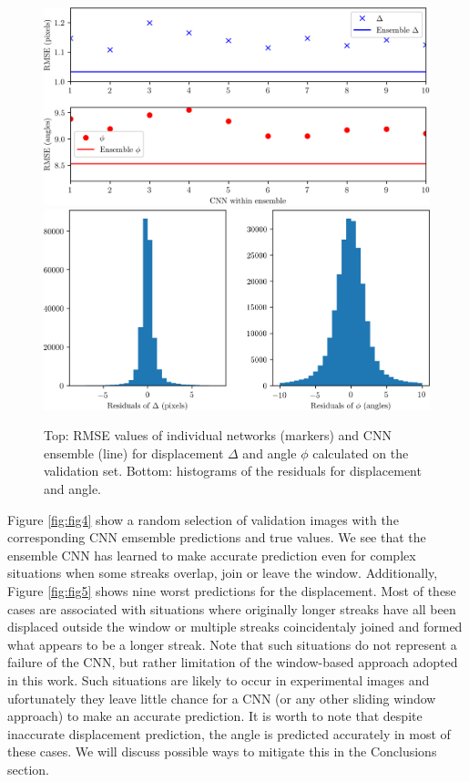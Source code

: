 \documentclass{svjour3}                     %
\begin{document}
\begin{figure}
\includegraphics[width=\textwidth]{figs/figure2a.png}
\includegraphics[width=\textwidth]{figs/figure2b.png}
\caption{Top: RMSE values of individual networks (markers) and CNN ensemble (line) for displacement $\Delta$ and angle $\phi$ calculated on the validation set. Bottom: histograms of the residuals for displacement and angle.}
\label{fig:fig3}
\end{figure}

Figure \ref{fig:fig4} show a random selection of validation images with the corresponding CNN emsemble predictions and true values. We see that the ensemble CNN has learned to make accurate prediction even for complex situations when some streaks overlap, join or leave the window. Additionally, Figure \ref{fig:fig5} shows nine worst predictions for the displacement. Most of these cases are associated with situations where originally longer streaks have all been displaced outside the window or multiple streaks coincidentaly joined and formed what appears to be a longer streak. Note that such situations do not represent a failure of the CNN, but rather limitation of the window-based approach adopted in this work. Such situations are likely to occur in experimental images and ufortunately they  leave little chance for a CNN (or any other sliding window approach) to make an accurate prediction. It is worth to note that despite inaccurate displacement prediction, the angle is predicted accurately in most of these cases. We will discuss possible ways to mitigate this in the Conclusions section.
\end{document}
